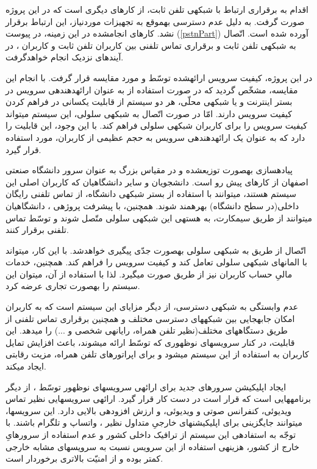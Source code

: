 اقدام به برقراری ارتباط  با شبکه\nf ی تلفن ثابت، از کارهای دیگری است که در این پروژه صورت گرفت. به دلیل عدم دسترسی به\nf موقع به تجهیزات موردنیاز، این ارتباط برقرار نشد. کارهای انجام\nf شده در این زمینه، در پیوست (\ref{pstnPart}) آورده شده است. اتّصال  به شبکه\nf ی تلفن ثابت و برقراری تماس تلفنی بین کاربران تلفن ثابت و کاربران ، در آینده\nf ای نزدیک انجام خواهدگرفت. 

در این پروژه، کیفیت سرویس ارائه\nf شده توسّط  و  مورد مقایسه قرار گرفت. با انجام این مقایسه، مشخّص گردید که در صورت استفاده از  به عنوان ارائه\nf دهنده\nf ی سرویس  در بستر اینترنت و یا شبکه\nf ی محلّی، هر دو سیستم از قابلیت یکسانی در فراهم کردن کیفیت سرویس دارند. امّا در صورت اتّصال  به شبکه\nf ی سلولی، این سیستم می\nf تواند کیفیت سرویس را برای کاربران شبکه\nf ی سلولی فراهم کند. با این وجود،  این قابلیت را دارد که به عنوان یک ارائه\nf دهنده\nf ی سرویس  به حجم عظیمی از کاربران، مورد استفاده قرار گیرد.  

پیاده\nf سازی  به\nf صورت توزیع\nf شده و در مقیاس بزرگ به عنوان سرور  دانشگاه صنعتی اصفهان از کارهای پیش رو است. دانشجویان و سایر دانشگاهیان که کاربران اصلی این سیستم هستند، می\nf توانند با استفاده از بستر شبکه\nf ی دانشگاه، از تماس تلفنی رایگان داخلی(در سطح دانشگاه) بهره\nf مند شوند. همچنین، با پیشرفت پروژه\nf ی ، دانشگاهیان می\nf توانند از طریق سیم\nf کارت، به هسته\nf ی این شبکه\nf ی سلولی متّصل شوند و توسّط  تماس تلفنی برقرار کنند.
  
اتّصال  از طریق  به شبکه\nf ی سلولی به\nf صورت جدّی پیگیری خواهدشد. با این کار،  می\nf تواند با المان\nf های شبکه\nf ی سلولی تعامل کند و کیفیت سرویس را فراهم کند. همچنین، خدمات مالیِ حساب کاربران نیز از طریق  صورت می\nf گیرد. لذا با استفاده از آن، می\nf توان این سیستم را به\nf صورت تجاری عرضه کرد.

عدم وابستگی  به شبکه\nf ی دسترسی، از دیگر مزایای این سیستم است که به کاربران امکان جابه\nf جایی بین شبکه\nf های دسترسی مختلف و همچنین برقراری تماس تلفنی از طریق دستگاه\nf های مختلف(نظیر تلفن همراه، رایانه\nf ی شخصی و ...) را می\nf دهد. این قابلیت، در کنار سرویس\nf های نوظهوری که توسّط  ارائه می\nf شوند، باعث افزایش تمایل کاربران به استفاده از این سیستم می\nf شود و برای اپراتورهای تلفن همراه، مزیت رقابتی ایجاد می\nf کند.

ایجاد اپلیکیشن سرورهای جدید برای ارائه\nf ی سرویس\nf های نوظهور توسّط ، از دیگر برنامه\nf هایی است که قرار است در دست کار قرار گیرد. ارائه\nf ی سرویس\nf هایی نظیر تماس ویدیوئی، کنفرانس صوتی و ویدیوئی،  و  ارزش افزوده\nf ی بالایی دارد. این سرویس\nf ها، می\nf توانند جایگزینی برای اپلیکیشن\nf های خارجیِ متداول نظیر ، واتساپ و تلگرام باشند. با توجّه به استفاده\nf ی این سیستم از ترافیک داخلی کشور و عدم استفاده از سرورهایِ خارج از کشور، هزینه\nf ی استفاده از این سرویس نسبت به سرویس\nf های مشابه خارجی کمتر بوده و از امنیّت بالاتری برخوردار است.
